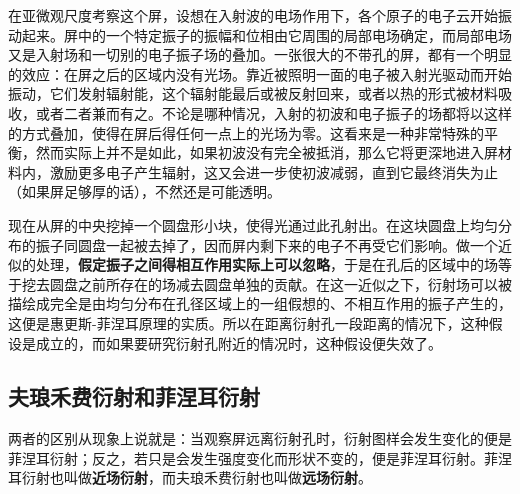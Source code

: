 \documentclass[UTF8]{ctexart}
\begin{document}
	在亚微观尺度考察这个屏，设想在入射波的电场作用下，各个原子的电子云开始振动起来。屏中的一个特定振子的振幅和位相由它周围的局部电场确定，而局部电场又是入射场和一切别的电子振子场的叠加。一张很大的不带孔的屏，都有一个明显的效应：在屏之后的区域内没有光场。靠近被照明一面的电子被入射光驱动而开始振动，它们发射辐射能，这个辐射能最后或被反射回来，或者以热的形式被材料吸收，或者二者兼而有之。不论是哪种情况，入射的初波和电子振子的场都将以这样的方式叠加，使得在屏后得任何一点上的光场为零。这看来是一种非常特殊的平衡，然而实际上并不是如此，如果初波没有完全被抵消，那么它将更深地进入屏材料内，激励更多电子产生辐射，这又会进一步使初波减弱，直到它最终消失为止（如果屏足够厚的话），不然还是可能透明。
	
	现在从屏的中央挖掉一个圆盘形小块，使得光通过此孔射出。在这块圆盘上均匀分布的振子同圆盘一起被去掉了，因而屏内剩下来的电子不再受它们影响。做一个近似的处理，\textbf{假定振子之间得相互作用实际上可以忽略}，于是在孔后的区域中的场等于挖去圆盘之前所存在的场减去圆盘单独的贡献。在这一近似之下，衍射场可以被描绘成完全是由均匀分布在孔径区域上的一组假想的、不相互作用的振子产生的，这便是惠更斯-菲涅耳原理的实质。所以在距离衍射孔一段距离的情况下，这种假设是成立的，而如果要研究衍射孔附近的情况时，这种假设便失效了。
	
	\subsection{夫琅禾费衍射和菲涅耳衍射}
	两者的区别从现象上说就是：当观察屏远离衍射孔时，衍射图样会发生变化的便是菲涅耳衍射；反之，若只是会发生强度变化而形状不变的，便是菲涅耳衍射。菲涅耳衍射也叫做\textbf{近场衍射}，而夫琅禾费衍射也叫做\textbf{远场衍射}。
	
\end{document}
